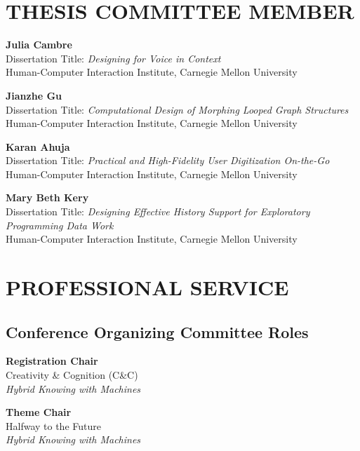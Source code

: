\documentclass[11pt]{article} %
\begin{document}
\section*{\uppercase{Thesis committee member}}

 \textbf{Julia Cambre}\\
Dissertation Title: \textit{Designing for Voice in Context}\\
Human-Computer Interaction Institute, Carnegie Mellon University
\medskip

 \textbf{Jianzhe Gu}\\
Dissertation Title: \textit{Computational Design of Morphing Looped Graph Structures}\\
Human-Computer Interaction Institute, Carnegie Mellon University
\medskip

 \textbf{Karan Ahuja}\\
Dissertation Title: \textit{Practical and High-Fidelity User Digitization On-the-Go}\\
Human-Computer Interaction Institute, Carnegie Mellon University
\medskip

 \textbf{Mary Beth Kery}\\
Dissertation Title: \textit{Designing Effective History Support for Exploratory Programming Data Work}\\
Human-Computer Interaction Institute, Carnegie Mellon University


\section*{\uppercase{Professional Service}}
\subsection*{Conference Organizing Committee Roles}

 \textbf{Registration Chair}\\
Creativity \& Cognition (C\&C)\\ 
\textit{Hybrid Knowing with Machines}
\medskip

 \textbf{Theme Chair}\\
Halfway to the Future\\ 
\textit{Hybrid Knowing with Machines}
\medskip
\end{document}
